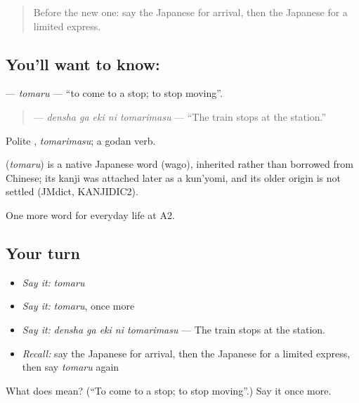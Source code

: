 \label{lesson:JA-C199-tomaru}



\begin{quote}
Before the new one: say the Japanese for arrival, then the Japanese for a limited express.
\end{quote}

\subsection*{You'll want to know: }
\textbf{} — \emph{tomaru} — \textquotedblleft{}to come to a stop; to stop moving\textquotedblright{}.

\begin{quote}
\textbf{  } — \emph{densha ga eki ni tomarimasu} — \textquotedblleft{}The train stops at the station.\textquotedblright{}
\end{quote}

Polite \textbf{}, \emph{tomarimasu}; a godan verb.

\begin{cousinweb}
\textbf{} (\emph{tomaru}) is a native Japanese word (wago), inherited rather than borrowed from Chinese; its kanji was attached later as a kun'yomi, and its older origin is not settled (JMdict, KANJIDIC2).
\end{cousinweb}

\begin{grammarlens}[title={What you've built}]
One more word for everyday life at A2.
\end{grammarlens}

\subsection*{Your turn}
\begin{itemize}
\raggedright
  \item \emph{Say it:} \emph{tomaru}
  \item \emph{Say it:} \emph{tomaru}, once more
  \item \emph{Say it:} \emph{densha ga eki ni tomarimasu} — The train stops at the station.
  \item \emph{Recall:} say the Japanese for arrival, then the Japanese for a limited express, then say \emph{tomaru} again
\end{itemize}

\begin{tcolorbox}[breakable,colback=teal!4,colframe=teal!35!black,title={Before you move on}]
What does  mean? (\textquotedblleft{}To come to a stop; to stop moving\textquotedblright{}.) Say it once more.
\end{tcolorbox}
